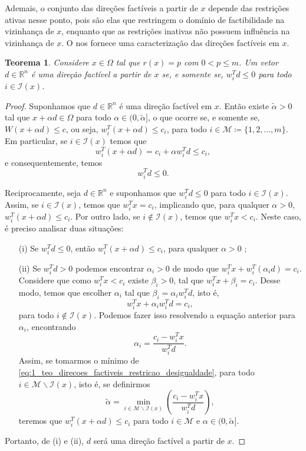 \documentclass[12pt,a4paper]{scrartcl}
\def\RR{\mathds{R}}
\newtheorem{teo}{Teorema}
\theoremstyle{definition}%
\begin{document}
Ademais, o conjunto das direções factíveis a partir de $x$ depende das restrições ativas nesse ponto, pois são elas que restringem o domínio de factibilidade na vizinhança de $x$, enquanto que as restrições inativas não possuem influência na vizinhança de $x$.
O  nos fornece uma caracterização das direções factíveis em $x$.

\begin{teo} \label{teo:direcoes_factiveis_restricao_desigualdade}
Considere $x\in \Omega$ tal que $r(x) = p$ com $0<p \leq m$. Um vetor $d \in \RR^{n}$ é uma direção factível a partir de $x$ se, e somente se, $w_{i}^{T}d \leq 0$ para todo $i \in \mathcal{I} (x)$.
\end{teo}
\begin{proof}
Suponhamos que $d\in \RR^{n}$ é uma direção factível em $x$. Então existe $\tilde{\alpha} >0$ tal que $x+\alpha d \in \Omega$ para todo $\alpha \in (0, \tilde{\alpha} ]$, o que ocorre se, e somente se, $W(x+\alpha d) \leq c$, ou seja, $w_{i}^{T}(x+\alpha d) \leq c_{i}$, para todo $i \in \mathcal{M} \coloneqq \{ 1,2, \ldots ,m \}$. 
Em particular, se $i\in \mathcal{I} (x)$ temos que
\[
w_{i}^{T}(x+\alpha d) = c_{i} + \alpha w_{i}^{T}d \leq c_{i},
\]
e consequentemente, temos
\[
w_{i}^{T}d \leq 0.
\]

Reciprocamente, seja $d\in \RR^{n}$ e suponhamos que $w_{i}^{T}d \leq 0$ para todo $i \in \mathcal{I} (x)$. Assim, se $i \in \mathcal{I} (x)$, temos que $w_{i}^{T} x = c_{i}$, implicando que, para qualquer $\alpha >0$, $w_{i}^{T}(x+\alpha d) \leq c_{i}$.
Por outro lado, se $i \notin \mathcal{I}(x)$, temos que $w_{i}^{T} x < c_{i}$. Neste caso, é preciso analisar duas situações:
\begin{enumerate}
	\item[(i)] Se $w_{i}^{T}d \leq 0$, então $w_{i}^{T}(x + \alpha d) \leq c_{i}$, para qualquer $\alpha >0$             ;

	\item[(ii)]Se $w_{i}^{T}d >0$ podemos encontrar $\alpha_{i} >0$ de modo que $w_{i}^{T}x + w_{i}^{T}(\alpha_{i} d) = c_{i}$. Considere que como $w_{i}^{T}x < c_{i}$ existe $\beta_{i} >0$, tal que $w_{i}^{T}x + \beta_{i} = c_{i}$. Desse modo, temos que escolher $\alpha_{i}$ tal que $\beta_{i} = \alpha_{i} w_{i}^{T} d$, isto é,
	\[
	w_{i}^{T}x + \alpha_{i} w_{i}^{T}d = c_{i} ,
	\]
	para todo $i \notin \mathcal{I}(x)$. Podemos fazer isso resolvendo a equação anterior para $\alpha_{i}$, encontrando
	\[ \label{eq:1_teo_direcoes_factiveis_restricao_desigualdade}
	\alpha_{i} = \dfrac{c_{i} - w_{i}^{T}x}{w_{i}^{T}d}.
	\]
	Assim, se tomarmos o mínimo de \eqref{eq:1_teo_direcoes_factiveis_restricao_desigualdade}, para todo $i \in \mathcal{M} \backslash \mathcal{I}(x)$, isto é, se definirmos
	\[ \label{eq:2_teo_direcoes_factiveis_restricao_desigualdade}
	\tilde{\alpha} = \min_{i \in \mathcal{M} \backslash \mathcal{I}(x) } \left( \dfrac{c_{i} - w_{i}^{T}x}{w_{i}^{T}d} \right) ,
	\]
	teremos que $w_{i}^{T}(x + \alpha d) \leq c_{i}$ para todo $i \in \mathcal{M}$ e $\alpha \in (0,\tilde{\alpha} ]$. 
\end{enumerate}	
Portanto, de (i) e (ii), $d$ será uma direção factível a partir de $x$.
\end{proof}
\end{document}
